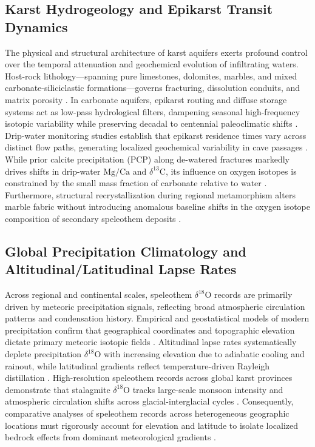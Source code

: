 \documentclass[sn-basic,Numbered]{sn-jnl}%
\begin{document}
\subsection{Karst Hydrogeology and Epikarst Transit Dynamics}
The physical and structural architecture of karst aquifers exerts profound control over the temporal attenuation and geochemical evolution of infiltrating waters. Host-rock lithology---spanning pure limestones, dolomites, marbles, and mixed carbonate-siliciclastic formations---governs fracturing, dissolution conduits, and matrix porosity \cite{ford2007}. In carbonate aquifers, epikarst routing and diffuse storage systems act as low-pass hydrological filters, dampening seasonal high-frequency isotopic variability while preserving decadal to centennial paleoclimatic shifts \cite{mcdermott2004, baker2019}. Drip-water monitoring studies establish that epikarst residence times vary across distinct flow paths, generating localized geochemical variability in cave passages \cite{baldini2006, treble2005}. While prior calcite precipitation (PCP) along de-watered fractures markedly drives shifts in drip-water $\text{Mg}/\text{Ca}$ and $\delta^{13}\text{C}$, its influence on oxygen isotopes is constrained by the small mass fraction of carbonate relative to water \cite{fairchild2012, wong2015}. Furthermore, structural recrystallization during regional metamorphism alters marble fabric without introducing anomalous baseline shifts in the oxygen isotope composition of secondary speleothem deposits \cite{frisia2000}.

\subsection{Global Precipitation Climatology and Altitudinal/Latitudinal Lapse Rates}
Across regional and continental scales, speleothem $\delta^{18}\text{O}$ records are primarily driven by meteoric precipitation signals, reflecting broad atmospheric circulation patterns and condensation history. Empirical and geostatistical models of modern precipitation confirm that geographical coordinates and topographic elevation dictate primary meteoric isotopic fields \cite{bowen2003}. Altitudinal lapse rates systematically deplete precipitation $\delta^{18}\text{O}$ with increasing elevation due to adiabatic cooling and rainout, while latitudinal gradients reflect temperature-driven Rayleigh distillation \cite{lachniet2009, deininger2017}. High-resolution speleothem records across global karst provinces demonstrate that stalagmite $\delta^{18}\text{O}$ tracks large-scale monsoon intensity and atmospheric circulation shifts across glacial-interglacial cycles \cite{wang2001, auler2001}. Consequently, comparative analyses of speleothem records across heterogeneous geographic locations must rigorously account for elevation and latitude to isolate localized bedrock effects from dominant meteorological gradients \cite{fohlmeister2020}.
\end{document}
